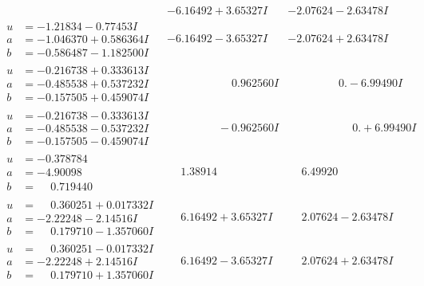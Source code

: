 \documentclass[1p]{elsarticle_modified}
\theoremstyle{definition}
\begin{document}
$$\begin{array}{c|c|c}
 & -6.16492 + 3.65327 I & -2.07624 - 2.63478 I \\ \hline\begin{aligned}
u &= -1.21834 - 0.77453 I \\
a &= -1.046370 + 0.586364 I \\
b &= -0.586487 - 1.182500 I\end{aligned}
 & -6.16492 - 3.65327 I & -2.07624 + 2.63478 I \\ \hline\begin{aligned}
u &= -0.216738 + 0.333613 I \\
a &= -0.485538 + 0.537232 I \\
b &= -0.157505 + 0.459074 I\end{aligned}
 & \phantom{-0.000000 -}0.962560 I & \phantom{-0.000000 } 0. - 6.99490 I \\ \hline\begin{aligned}
u &= -0.216738 - 0.333613 I \\
a &= -0.485538 - 0.537232 I \\
b &= -0.157505 - 0.459074 I\end{aligned}
 & \phantom{-0.000000 } -0.962560 I & \phantom{-0.000000 -}0. + 6.99490 I \\ \hline\begin{aligned}
u &= -0.378784\phantom{ +0.000000I} \\
a &= -4.90098\phantom{ +0.000000I} \\
b &= \phantom{-}0.719440\phantom{ +0.000000I}\end{aligned}
 & \phantom{-}1.38914\phantom{ +0.000000I} & \phantom{-}6.49920\phantom{ +0.000000I} \\ \hline\begin{aligned}
u &= \phantom{-}0.360251 + 0.017332 I \\
a &= -2.22248 - 2.14516 I \\
b &= \phantom{-}0.179710 - 1.357060 I\end{aligned}
 & \phantom{-}6.16492 + 3.65327 I & \phantom{-}2.07624 - 2.63478 I \\ \hline\begin{aligned}
u &= \phantom{-}0.360251 - 0.017332 I \\
a &= -2.22248 + 2.14516 I \\
b &= \phantom{-}0.179710 + 1.357060 I\end{aligned}
 & \phantom{-}6.16492 - 3.65327 I & \phantom{-}2.07624 + 2.63478 I \\ \hline\begin{aligned}

\end{aligned}
\end{array}$$
\end{document}
